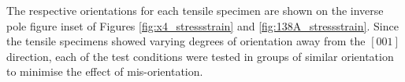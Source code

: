 \documentclass[a4paper,12pt,times,numbered,print,index]{Classes/PhDThesisPSnPDF}
\begin{document}
The respective orientations for each tensile specimen are shown on the inverse pole figure inset of Figures \ref{fig:x4_stressstrain} and \ref{fig:138A_stressstrain}. Since the tensile specimens showed varying degrees of orientation away from the $[001]$ direction, each of the test conditions were tested in groups of similar orientation to minimise the effect of mis-orientation.\\ %
\end{document}
